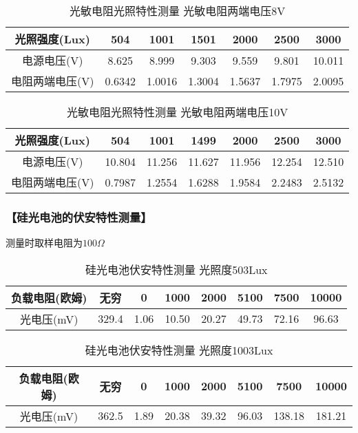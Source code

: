 \documentclass{ctexart}
\let\oldsubsubsection\subsubsection
\renewcommand{\subsubsection}[1]{\oldsubsubsection{\!\!\!\!\!\!【#1】}}
\begin{document}
\begin{table*}[!htbp]
  \centering
  \begin{tabular}{|c|c|c|c|c|c|c|}
    \hline
    光照强度(Lux) &504&1001&1501&2000&2500&3000\\\hline
    电源电压(V) &8.625&8.999&9.303&9.559&9.801&10.011\\\hline
    电阻两端电压(V) &0.6342&1.0016&1.3004&1.5637&1.7975&2.0095\\\hline
  \end{tabular}
  \caption{光敏电阻光照特性测量 光敏电阻两端电压8V}
\end{table*}

\begin{table*}[!htbp]
  \centering
  \begin{tabular}{|c|c|c|c|c|c|c|}
    \hline
    光照强度(Lux) &504&1001&1499&2000&2500&3000\\\hline
    电源电压(V) &10.804&11.256&11.627&11.956&12.254&12.510\\\hline
    电阻两端电压(V) &0.7987&1.2554&1.6288&1.9584&2.2483&2.5132\\\hline
  \end{tabular}
  \caption{光敏电阻光照特性测量 光敏电阻两端电压10V}
\end{table*}

\subsubsection{硅光电池的伏安特性测量}

测量时取样电阻为$100\Omega$

\begin{table*}[!htbp]
  \centering
  \begin{tabular}{|c|c|c|c|c|c|c|c|}
    \hline
    负载电阻(欧姆) &无穷&0&1000&2000&5100&7500&10000\\\hline
    光电压(mV) &329.4&1.06&10.50&20.27&49.73&72.16&96.63\\\hline
  \end{tabular}
  \caption{硅光电池伏安特性测量 光照度503Lux}
\end{table*}

\begin{table*}[!htbp]
  \centering
  \begin{tabular}{|c|c|c|c|c|c|c|c|}
    \hline
    负载电阻(欧姆) &无穷&0&1000&2000&5100&7500&10000\\\hline
    光电压(mV) &362.5&1.89&20.38&39.32&96.03&138.18&181.21\\\hline
  \end{tabular}
  \caption{硅光电池伏安特性测量 光照度1003Lux}
\end{table*}
\end{document}
